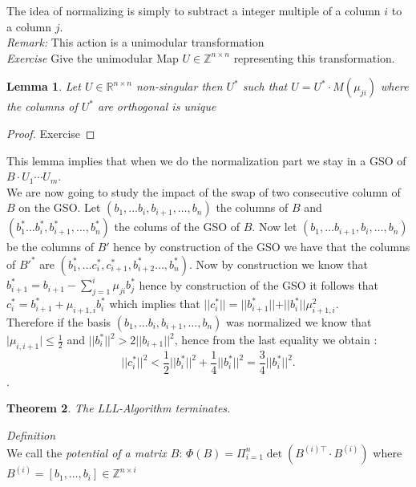 \documentclass[a4paper,11pt,american]{article}
\newcommand{\R}{\mathbb{R}}
\newcommand{\Z}{\mathbb{Z}}
\newcommand{\norm}[1]{\vert\vert#1\vert\vert}
\theoremstyle{plain}
\newtheorem{theorem}{Theorem}
\newtheorem{lemma}[theorem]{Lemma}
\theoremstyle{definition}
\begin{document}
The idea of normalizing is simply to subtract a integer multiple of a column $i$ to a column $j$.\\
\emph{Remark:} This action is a unimodular transformation \\
\emph{Exercise} Give the unimodular Map $U\in\Z^{n\times n}$ representing this transformation.\\
\begin{lemma}
    Let $U\in\R^{n\times n}$ non-singular then $U^*$ such that $U=U^*\cdot M(\mu_{ji})$ where the columns of $U^*$ are orthogonal is unique 
\end{lemma}
\begin{proof}
    Exercise
\end{proof}
This lemma implies that when we do the normalization part we stay in a GSO of $B\cdot U_1\cdots U_m$.\\
We are now going to study the impact of the swap of two consecutive column of $B$ on the GSO. Let $(b_1,\dots b_i,b_{i+1},\dots,b_n)$ the columns of $B$ and $(b_1^*\dots b_i^*,b_{i+1}^*,\dots,b_n^*)$ the colums of the GSO of $B$. Now let $(b_1,\dots b_{i+1},b_{i},\dots,b_n)$ be the columns of $B'$ hence by construction of the GSO we have that the columns of $B'^*$ are $(b_1^*,\dots c_i^*,c_{i+1}^*,b_{i+2}^*\dots,b_n^*)$. Now by construction we know that $b_{i+1}^*=b_{i+1}-\sum_{j=1}^i\mu_{ji}b_j^*$ hence by construction of the GSO it follows that $c_i^*=b_{i+1}^*+\mu_{i+1,i}b_i^*$ which implies that $\norm{c_i^*}=\norm {b_{i+1}^*}+\norm{b_i^*}\mu_{i+1,i}^2$.\\ Therefore if the basis $(b_1,\dots b_i,b_{i+1},\dots,b_n)$ was normalized we know that $\vert\mu_{i,i+1}\vert\leq \frac{1}{2}$ and $\norm{b_i^*}^2> 2\norm{b_{i+1}}^2$, hence from the last equality we obtain : \begin{equation}\label{3/4}
    \norm{c_i^*}^2<\frac{1}{2}\norm{b_i^*}^2+\frac{1}{4}\norm{b_i^*}^2=\frac{3}{4}\norm{b_i^*}^2.
\end{equation}.\\
\begin{theorem}
    The LLL-Algorithm terminates.
\end{theorem}
\emph{Definition}\\
We call the \emph{potential of a matrix $B$}: $\Phi(B)=\Pi^n_{i=1} \det(B^{(i)\top}\cdot B^{(i)})$ where $B^{(i)}=[b_1,\dots,b_i]\in\Z^{n\times i}$
\end{document}
